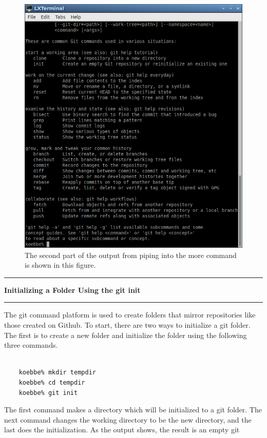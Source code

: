 \documentclass[10pt,fleqn]{article}
\begin{document}
\begin{figure}[h]
\centering
\includegraphics[width=5.0in]{../images/git_03.png}
\vskip0.1in
\caption{The second part of the output from piping into the more command is
shown in this figure.}
\end{figure}
\eject
\vskip0.1in\hrule\vskip0.1in\noindent
{\bf Initializing a Folder Using the git init} 
\vskip0.1in\hrule\vskip0.1in\noindent
The git command platform is used to create folders that mirror repositories like
those created on Github. To start, there are two ways to initialize a git
folder. The first is to create a new folder and initialize the folder using the
following three commands.
\begin{verbatim}

    koebbe% mkdir tempdir
    koebbe% cd tempdir
    koebbe% git init

\end{verbatim}
The first command makes a directory which will be initialized to a git folder.
The next command changes the working directory to be the new directory, and the
last does the initialization. As the output shows, the result is an empty git
\end{document}
